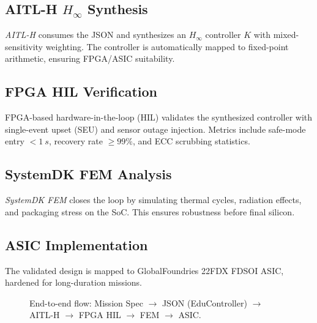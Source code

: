 \documentclass[conference]{IEEEtran}
\begin{document}
\subsection{AITL-H $H_\infty$ Synthesis}
\emph{AITL-H} consumes the JSON and synthesizes an $H_\infty$ controller $K$ with mixed-sensitivity weighting. The controller is automatically mapped to fixed-point arithmetic, ensuring FPGA/ASIC suitability.

\subsection{FPGA HIL Verification}
FPGA-based hardware-in-the-loop (HIL) validates the synthesized controller with single-event upset (SEU) and sensor outage injection. Metrics include safe-mode entry $< \SI{1}{s}$, recovery rate $\ge 99\%$, and ECC scrubbing statistics.

\subsection{SystemDK FEM Analysis}
\emph{SystemDK FEM} closes the loop by simulating thermal cycles, radiation effects, and packaging stress on the SoC. This ensures robustness before final silicon.

\subsection{ASIC Implementation}
The validated design is mapped to GlobalFoundries 22FDX FD\!SOI ASIC, hardened for long-duration missions.

\begin{figure}[t]
\centering
{}
\caption{End-to-end flow: Mission Spec $\to$ JSON (EduController) $\to$ AITL-H $\to$ FPGA HIL $\to$ FEM $\to$ ASIC.}
\label{fig:flow}
\end{figure}
\end{document}
